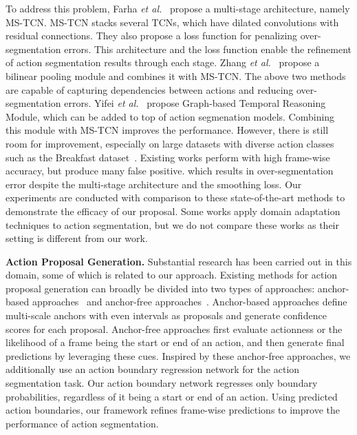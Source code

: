 \documentclass[10pt,twocolumn,letterpaper]{article}
\begin{document}
To address this problem, Farha \textit{et al.}~\cite{mstcn} propose a multi-stage architecture, namely MS-TCN.
MS-TCN stacks several TCNs, which have dilated convolutions with residual connections.
They also propose a loss function for penalizing over-segmentation errors.
This architecture and the loss function enable the refinement of action segmentation results through each stage.
Zhang \textit{et al.}~\cite{bpgaussian} propose a bilinear pooling module and combines it with MS-TCN.
The above two methods are capable of capturing dependencies between actions and reducing over-segmentation errors.
Yifei \textit{et al.}~\cite{as_graph} propose Graph-based Temporal Reasoning Module, which can be added to top of action segmenation models. Combining this module with MS-TCN improves the performance.
However, there is still room for improvement, especially on large datasets with diverse action classes such as the Breakfast dataset~\cite{breakfast}.
Existing works perform with high frame-wise accuracy, but produce many false positive.
which results in over-segmentation error despite the multi-stage architecture and the smoothing loss.
Our experiments are conducted with comparison to these state-of-the-art methods to demonstrate the efficacy of our proposal.
Some works \cite{as_da, as_ssl_da} apply domain adaptation techniques to action segmentation,
but we do not compare these works as their setting is different from our work.



\textbf{Action Proposal Generation.}
Substantial research has been carried out in this domain, some of which is related to our approach.
Existing methods for action proposal generation can broadly be divided into two types of approaches: anchor-based approaches~\cite{ssad,cbr,turntap} and anchor-free approaches~\cite{tag,bsn,bmn}.
Anchor-based approaches define multi-scale anchors with even intervals as proposals and generate confidence scores for each proposal.
Anchor-free approaches first evaluate actionness or the likelihood of a frame being the start or end of an action, and then generate final predictions by leveraging these cues.
Inspired by these anchor-free approaches, we additionally use an action boundary regression network for the action segmentation task.
Our action boundary network regresses only boundary probabilities, regardless of it being a start or end of an action.
Using predicted action boundaries, our framework refines frame-wise predictions to improve the performance of action segmentation.
\end{document}
